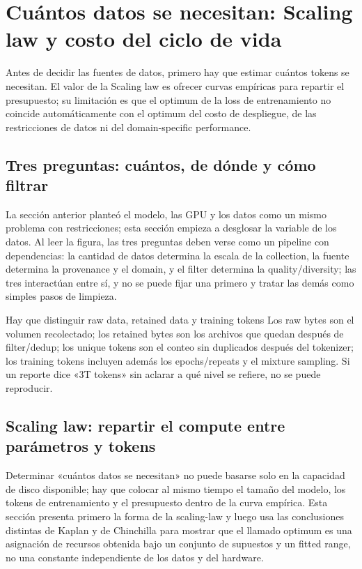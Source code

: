 \section{Cuántos datos se necesitan: Scaling law y costo del ciclo de vida}

Antes de decidir las fuentes de datos, primero hay que estimar cuántos tokens se necesitan. El valor de la Scaling law es ofrecer curvas empíricas para repartir el presupuesto; su limitación es que el optimum de la loss de entrenamiento no coincide automáticamente con el optimum del costo de despliegue, de las restricciones de datos ni del domain-specific performance.

\subsection{Tres preguntas: cuántos, de dónde y cómo filtrar}

La sección anterior planteó el modelo, las GPU y los datos como un mismo problema con restricciones; esta sección empieza a desglosar la variable de los datos. Al leer la figura, las tres preguntas deben verse como un pipeline con dependencias: la cantidad de datos determina la escala de la collection, la fuente determina la provenance y el domain, y el filter determina la quality/diversity; las tres interactúan entre sí, y no se puede fijar una primero y tratar las demás como simples pasos de limpieza.


\begin{importantbox}{Hay que distinguir raw data, retained data y training tokens}
Los raw bytes son el volumen recolectado; los retained bytes son los archivos que quedan después de filter/dedup; los unique tokens son el conteo sin duplicados después del tokenizer; los training tokens incluyen además los epochs/repeats y el mixture sampling. Si un reporte dice «3T tokens» sin aclarar a qué nivel se refiere, no se puede reproducir.
\end{importantbox}

\subsection{Scaling law: repartir el compute entre parámetros y tokens}

Determinar «cuántos datos se necesitan» no puede basarse solo en la capacidad de disco disponible; hay que colocar al mismo tiempo el tamaño del modelo, los tokens de entrenamiento y el presupuesto dentro de la curva empírica. Esta sección presenta primero la forma de la scaling-law y luego usa las conclusiones distintas de Kaplan y de Chinchilla para mostrar que el llamado optimum es una asignación de recursos obtenida bajo un conjunto de supuestos y un fitted range, no una constante independiente de los datos y del hardware.

